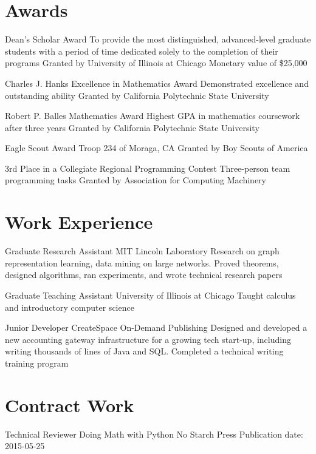\documentclass[11pt]{moderncv}
\begin{document}
   \section{Awards}
         {Dean's Scholar Award}
      {To provide the most distinguished, advanced-level graduate students with a period of time dedicated solely to the completion of their programs}
      {Granted by University of Illinois at Chicago}
      {}
      {Monetary value of \$25,000}

         {Charles J. Hanks Excellence in Mathematics Award}
      {Demonstrated excellence and outstanding ability}
      {Granted by California Polytechnic State University}
      {}
{}

         {Robert P. Balles Mathematics Award}
      {Highest GPA in mathematics coursework after three years}
      {Granted by California Polytechnic State University}
      {}
{}

         {Eagle Scout Award}
      {Troop 234 of Moraga, CA}
      {Granted by Boy Scouts of America}
      {}
{}

         {3rd Place in a Collegiate Regional Programming Contest}
      {Three-person team programming tasks}
      {Granted by Association for Computing Machinery}
      {}
{}


   \section{Work Experience}
         {Graduate Research Assistant}
      {MIT Lincoln Laboratory}
      {}
      {}
      {Research on graph representation learning, data mining on large networks. Proved theorems, designed algorithms, ran experiments, and wrote technical research papers}

         {Graduate Teaching Assistant}
      {University of Illinois at Chicago}
      {}
      {}
      {Taught calculus and introductory computer science}

         {Junior Developer}
      {CreateSpace On-Demand Publishing}
      {}
      {}
      {Designed and developed a new accounting gateway infrastructure for a growing tech start-up, including writing thousands of lines of Java and SQL. Completed a technical writing training program}


   \section{Contract Work}
         {Technical Reviewer}
      {Doing Math with Python}
      {No Starch Press}
      {}
      {Publication date: 2015-05-25}
\end{document}
